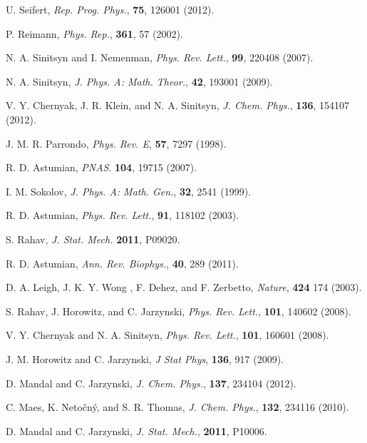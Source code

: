 \documentclass[aps,pre,showpacs,amsmath,amssymb,amsfonts,superscriptaddress,onecolumn,longbibliography]{revtex4-1}
\begin{document}
\begin{thebibliography}{99}
U. Seifert, {\em Rep. Prog. Phys.}, {\bf 75},  126001 (2012).

P. Reimann, {\em Phys. Rep.}, {\bf 361}, 57 (2002).

N. A. Sinitsyn and I. Nemenman, {\em Phys. Rev. Lett.\/}, {\bf 99}, 220408 (2007).

N. A. Sinitsyn, {\em J. Phys. A: Math. Theor.\/},
  {\bf 42}, 193001 (2009).

V. Y. Chernyak, J. R. Klein, and N. A. Sinitsyn, {\em J. Chem.
  Phys.\/}, {\bf 136}, 154107 (2012).

J. M. R. Parrondo, {\em Phys. Rev. E\/}, {\bf 57}, 7297 (1998).

R. D. Astumian, {\em {PNAS}\/}. {\bf 104}, 19715 (2007).

I. M. Sokolov, {\em J. Phys. A: Math. Gen.\/}, {\bf 32}, 2541 (1999).

R. D. Astumian, {\em Phys. Rev. Lett.\/}, {\bf 91}, 118102 (2003).

S. Rahav, {\em J. Stat. Mech. \/}
  {\bf 2011}, P09020.

R. D. Astumian, {\em Ann. Rev. Biophys.\/}, {\bf 40}, 289 (2011).

D. A. Leigh, J. K. Y. Wong , F. Dehez, and F. Zerbetto, {\em Nature\/}, {\bf 424}
  174 (2003).

S. Rahav, J. Horowitz, and C. Jarzynski, {\em Phys. Rev. Lett.\/}, {\bf 101},
  140602 (2008).


V. Y. Chernyak and N. A. Sinitsyn, {\em Phys. Rev. Lett.\/}, {\bf 101}, 160601 (2008).

J. M. Horowitz and C. Jarzynski, {\em J Stat Phys\/}, {\bf 136},  917 (2009).

D. Mandal and C. Jarzynski, {\em J. Chem. Phys.\/}, {\bf 137},
  234104 (2012).

C. Maes, K. Neto\v{c}n\'{y}, and S. R. Thomas, {\em J. Chem. Phys.\/},
  {\bf 132}, 234116 (2010).

D. Mandal and C. Jarzynski, {\em J. Stat. Mech.\/}, {\bf 2011}, P10006.


\end{thebibliography}
\end{document}
